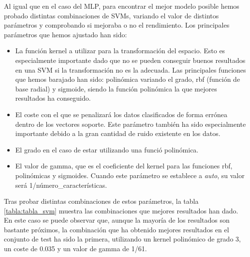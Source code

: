\documentclass[journal,twoside]{JoPhA}
\begin{document}
Al igual que en el caso del MLP, para encontrar el mejor modelo posible hemos probado distintas combinaciones de SVMs, variando el valor de distintos parámetros y comprobando si mejoraba o no el rendimiento. Los principales parámetros que hemos ajustado han sido: \\

\begin{itemize}
	\item La función kernel a utilizar para la transformación del espacio. Esto es especialmente importante dado que no se pueden conseguir buenos resultados en una SVM si la transformación no es la adecuada. Las principales funciones que hemos barajado han sido: polinómica variando el grado, rbf (función de base radial) y sigmoide, siendo la función polinómica la que mejores resultados ha conseguido. \\
	\item El coste con el que se penalizará los datos clasificados de forma errónea dentro de los vectores soporte. Este parámetro también ha sido especialmente importante debido a la gran cantidad de ruido existente en los datos. \\
	\item El grado en el caso de estar utilizando una funció polinómica. \\
	\item El valor de gamma, que es el coeficiente del kernel para las funciones rbf, polinómicas y sigmoides. Cuando este parámetro se establece a \textit{auto}, su valor será 1/número\_características. \\
\end{itemize}

Tras probar distintas combinaciones de estos parámetros, la tabla \ref{tabla:tabla_svm} muestra las combinaciones que mejores resultados han dado. En este caso se puede observar que, aunque la mayoría de los resultados son bastante próximos, la combinación que ha obtenido mejores resultados en el conjunto de test ha sido la primera, utilizando un kernel polinómico de grado 3, un coste de 0.035 y un valor de gamma de 1/61.
\end{document}
